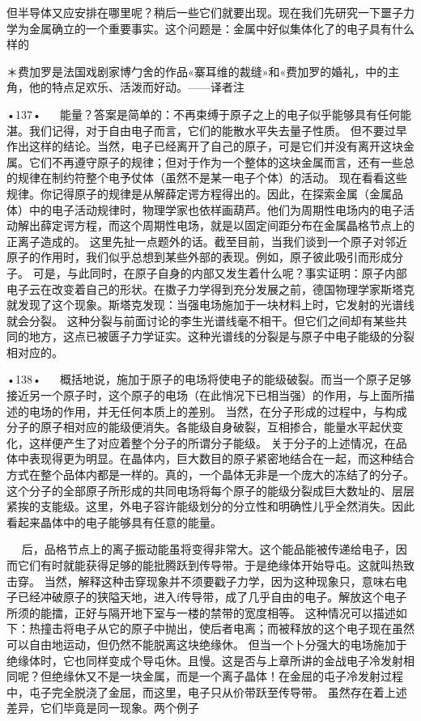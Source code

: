 但半导体又应安排在哪里呢？稍后一些它们就要出现。现在我们先研究一下噩子力学为金属确立的一个重要事实。这个问题是：金属中好似集体化了的电子具有什么样的

＊费加罗是法国戏剧家博勹舍的作品«寨耳维的裁缝»和«费加罗的婚礼，中的主角，他的特点足欢乐、活泼而好动。——译者注

•137•
  
能量？答案是简单的：不再束缚于原子之上的电子似乎能够具有任何能湛。我们记得，对于自由电子而言，它们的能散水平失去量子性质。
但不要过早作出这样的结论。当然，电子已经离开了自己的原子，可是它们并没有离开这块金属。它们不再遵守原子的规律；但对于作为一个整体的这块金属而言，还有一些总的规律在制约符整个电予仗体（虽然不是某一电子个体）的活动。
现在看看这些规律。你记得原子的规律是从解薛定谔方程得出的。因此，在探索金属（金属品体）中的电子活动规律时，物理学家也依样画葫芦。他们为周期性电场内的电子活动解出薛定谔方程，而这个周期性电场，就是以固定间距分布在金属晶格节点上的正离子造成的。
这里先扯一点题外的话。截至目前，当我们谈到一个原子对邻近原子的作用时，我们似乎总想到某些外部的表现。例如，原子彼此吸引而形成分子。
可是，与此同时，在原子自身的内部又发生着什么呢？事实证明：原子内部电子云在改变着自己的形状。在擞子力学得到充分发展之前，德国物理学家斯塔克就发现了这个现象。斯塔克发现：当强电场施加于一块材料上时，它发射的光谱线就会分裂。
这种分裂与前面讨论的李生光谱线毫不相干。但它们之间却有某些共同的地方，这点已被匮子力学证实。这种光谱线的分裂是与原子中电子能级的分裂相对应的。

•138•
  
概括地说，施加于原子的电场将使电子的能级破裂。而当一个原子足够接近另一个原子时，这个原子的电场（在此悄况下已相当强）的作用，与上面所描述的电场的作用，并无任何本质上的差别。
当然，在分子形成的过程中，与构成分子的原子相对应的能级便消失。各能级自身破裂，互相掺合，能量水平起伏变化，这样便产生了对应着整个分子的所谓分子能级。
关于分子的上述情况，在品体中表现得更为明显。在晶体内，巨大数目的原子紧密地结合在一起，而这种结合方式在整个品体内都是一样的。真的，一个晶体无非是一个庞大的冻结了的分子。
这个分子的全部原子所形成的共同电场将每个原子的能级分裂成巨大数址的、层层紧挨的支能级。这里，外电子容许能级划分的分立性和明确性儿乎全然消失。因此看起来晶体中的电子能够具有任意的能量。

 
  
后，品格节点上的离子振动能虽将变得非常大。这个能品能被传递给电子，因而它们有时就能获得足够的能批腾跃到传导带。于是绝缘体开始导屯。这就叫热致击穿。
当然，解释这种击穿现象并不须要戳子力学，因为这种现象只，意味右电子已经冲破原子的狭隘天地，进入f传导带，成了几乎自由的电子。解放这个电子所须的能擂，正好与隔开地下室与一楼的禁带的宽度相等。
这种情况可以描述如下：热撞击将电子从它的原子中抛出，使后者电离；而被释放的这个电子现在虽然可以自由地运动，但仍然不能脱离这块绝缘休。
但当一个卜分强大的电场施加于绝缘体时，它也同样变成个导屯休。且慢。这是否与上章所讲的金战电子冷发射相同呢？但绝缘休又不是一块金属，而是一个离子晶体！在金屈的屯子冷发射过程中，屯子完全脱浇了金屈，而这里，电子只从价带跃至传导带。
虽然存在着上述差异，它们毕竟是同一现象。两个例子

